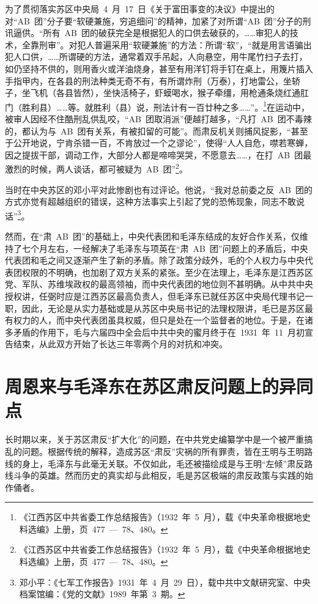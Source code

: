 为了贯彻落实苏区中央局~4~月~17~日《关于富田事变的决议》中提出的对“AB~团”分子要“软硬兼施，穷追细问”的精神，加紧了对所谓“AB~团”分子的刑讯逼供。“所有~AB~团的破获完全是根据犯人的口供去破获的，……审犯人的技术，全靠刑审”。对犯人普遍采用“软硬兼施”的方法：所谓“软”，“就是用言语骗出犯人口供，……所谓硬的方法，通常着双手吊起，人向悬空，用牛尾竹扫子去打，如仍坚持不供的，则用香火或洋油烧身，甚至有用洋钉将手钉在桌上，用篾片插入手指甲内，在各县的刑法种类无奇不有，有所谓炸刑（万泰），打地雷公，坐轿子，坐飞机（各县皆然），坐快活椅子，虾蟆喝水，猴子牵缰，用枪通条烧红通肛门（胜利县）……等。就胜利（县）说，刑法计有一百廿种之多……”。\footnote{《江西苏区中共省委工作总结报告》（1932~年~5~月），载《中央革命根据地史料选编》上册，页~477~—~78、480。}在运动中，被审人因经不住酷刑乱供乱咬，“AB~团取消派”便越打越多，“凡打~AB~团不毒辣的，都认为与~AB~团有关系，有被扣留的可能”。而肃反机关则捕风捉影，“甚至于公开地说，宁肯杀错一百，不肯放过一个之谬论”，使得“人人自危，噤若寒蝉，因之提拔干部，调动工作，大部分人都是啼啼哭哭，不愿意去……，在打~AB~团最激烈的时候，两人谈话，都可被疑为~AB~团”\footnote{《江西苏区中共省委工作总结报告》（1932~年~5~月），载《中央革命根据地史料选编》上册，页~477~—~78、480。}。

当时在中央苏区的邓小平对此惨剧也有过评论。他说，“我对总前委之反~AB~团的方式亦觉有超越组织的错误，这种方法事实上引起了党的恐怖现象，同志不敢说话”\footnote{邓小平：《七军工作报告》1931~年~4~月~29~日），载中共中文献研究室、中央档案馆编：《党的文献》1989~年第~3~期。}。

然而，在“肃~AB~团”的基础上，中央代表团和毛泽东结成的友好合作关系，仅维持了七个月左右，一经解决了毛泽东与项英在“肃~AB~团”问题上的矛盾后，中央代表团和毛之间又逐渐产生了新的矛盾。除了政策分歧外，毛的个人权力与中央代表团权限的不明确，也加剧了双方关系的紧张。至少在法理上，毛泽东是江西苏区党、军队、苏维埃政权的最高领袖，而中央代表团的地位则不甚明确。从中共中央授权讲，任弼时应是江西苏区最高负责人，但毛泽东已就任苏区中央局代理书记一职，因此，无论是从实力基础或是从苏区中央局书记的法理权限讲，毛已是苏区最有权力的人，而中央代表团虽具权威，但只是处在一个监督者的地位。于是，在诸多矛盾的作用下，毛与六届四中全会后中共中央的蜜月终于在~1931~年~11~月初宣告结束，从此双方开始了长达三年零两个月的对抗和冲突。

\section{周恩来与毛泽东在苏区肃反问题上的异同点}

长时期以来，关于苏区肃反“扩大化”的问题，在中共党史编纂学中是一个被严重搞乱的问题。根据传统的解释，造成苏区“肃反”灾祸的所有罪责，皆在王明与王明路线的身上，毛泽东与此毫无关联。不仅如此，毛还被描绘成是与王明“左倾”肃反路线斗争的英雄。然而历史的真实却与此相反，毛是苏区极端的肃反政策与实践的始作俑者。

